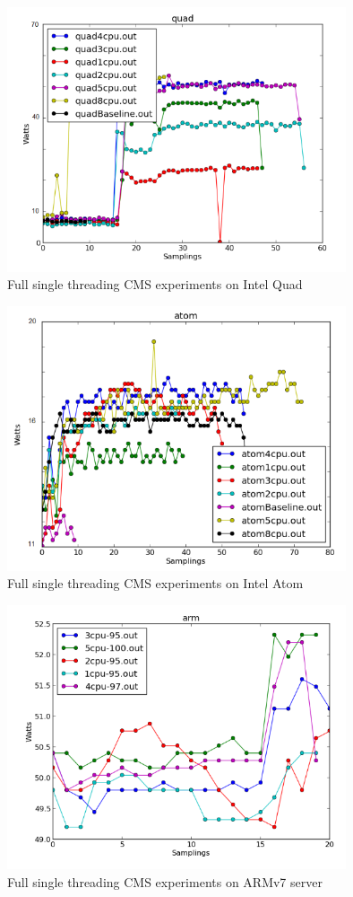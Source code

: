 \begin{figure}[h!]
  \centering
    \includegraphics[width=100mm]{"img/aalto/aalto_total_quad"}
    \caption{Full single threading CMS experiments on Intel Quad}
    \label{fig:aalto_quad_clamp}
\end{figure}

\begin{figure}[h!]
  \centering
    \includegraphics[width=100mm]{"img/aalto/aalto_total_atom"}
    \caption{Full single threading CMS experiments on Intel Atom}
    \label{fig:aalto_atom_clamp}
\end{figure}

\begin{figure}[h!]
  \centering
    \includegraphics[width=100mm]{"img/aalto/aalto_total_arm"}
    \caption{Full single threading CMS experiments on ARMv7 server}
    \label{fig:aalto_arm_clamp}
\end{figure}


